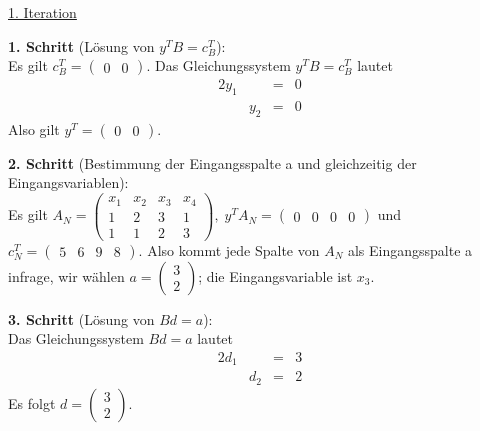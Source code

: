 \documentclass[10pt,a4paper,oneside,ngerman,numbers=noenddot]{scrartcl}
\begin{document}
		\underline{1. Iteration}
		
		\textbf{1. Schritt} (Lösung von $y^{T}B = c_{B}^{T}$):\\
		Es gilt $c_{B}^{T} = \begin{pmatrix} 0 & 0 \end{pmatrix}$. Das Gleichungssystem $y^{T}B = c_{B}^{T}$ lautet
		\begin{alignat*}{2}
			y_{1} & &=& 0 \\
			& y_{2} &=& 0
		\end{alignat*}
		Also gilt $y^{T} = \begin{pmatrix} 0 & 0 \end{pmatrix}$.
		
		\textbf{2. Schritt} (Bestimmung der Eingangsspalte a und gleichzeitig der Eingangsvariablen):\\
		Es gilt $A_{N} = \begin{pmatrix} x_{1} & x_{2} & x_{3} & x_{4} \\ 1 & 2 & 3 & 1 \\ 1 & 1 & 2 & 3 \end{pmatrix},\; y^{T}A_{N} = \begin{pmatrix} 0 & 0 & 0 & 0\end{pmatrix}$ und $c_{N}^{T} = \begin{pmatrix} 5 & 6 & 9 & 8 \end{pmatrix}$. Also kommt jede Spalte von $A_{N}$ als Eingangsspalte a infrage, wir wählen $a = \begin{pmatrix} 3 \\ 2 \end{pmatrix}$; die Eingangsvariable ist $x_{3}$.
		
		\textbf{3. Schritt} (Lösung von $Bd = a$):\\
		Das Gleichungssystem $Bd = a$ lautet
		\begin{alignat*}{2}
			d_{1} & &=& 3 \\
			& d_{2} &=& 2
		\end{alignat*}
		Es folgt $d = \begin{pmatrix}3 \\ 2 \end{pmatrix}$.
		
\end{document}
